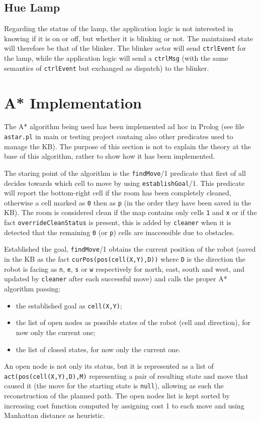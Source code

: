 \subsection{Hue Lamp}
Regarding the status of the lamp, the application logic is not interested in knowing if it is on or off, but whether it is blinking or not. The maintained state will therefore be that of the blinker. The blinker actor will send \texttt{ctrlEvent} for the lamp, while the application logic will send a \texttt{ctrlMsg} (with the same semantics of \texttt{ctrlEvent} but exchanged as dispatch) to the blinker.

\section{A* Implementation}\label{prt:astar_prolog}
The A* algorithm being used has been implemented ad hoc in Prolog (see file \texttt{astar.pl} in main or testing project containg also other predicates used to manage the KB). The purpose of this section is not to explain the theory at the base of this algorithm, rather to show how it has been implemented.

The staring point of the algorithm is the \texttt{findMove}/1 predicate that first of all decides towards which cell to move by using \texttt{establishGoal}/1. This predicate will report the bottom-right cell if the room has been completely cleaned, otherwise a cell marked as \texttt{0} then as \texttt{p} (in the order they have been saved in the KB).
The room is considered clean if the map contains only cells \texttt{1} and \texttt{x} or if the fact \texttt{overrideCleanStatus} is present, this is added by \texttt{cleaner} when it is detected that the remaining \texttt{0} (or \texttt{p}) cells are inaccessible due to obstacles.

Established the goal, \texttt{findMove}/1 obtains the current position of the robot (saved in the KB as the fact \texttt{curPos(pos(cell(X,Y),D))} where \texttt{D} is the direction the robot is facing as \texttt{n}, \texttt{e}, \texttt{s} or \texttt{w} respectively for north, east, south and west, and updated by \texttt{cleaner} after each successful move) and calls the proper A* algorithm passing:
\begin{itemize}
	\item the established goal as \texttt{cell(X,Y)};
	\item the list of open nodes as possible states of the robot (cell and direction), for now only the current one;
	\item the list of closed states, for now only the current one.
\end{itemize}
An open node is not only its status, but it is represented as a list of \texttt{act(pos(cell(X,Y),D),M)} representing a pair of resulting state and move that caused it (the move for the starting state is \texttt{null}), allowing as such the reconstruction of the planned path. The open nodes list is kept sorted by increasing cost function computed by assigning cost 1 to each move and using Manhattan distance as heuristic.

